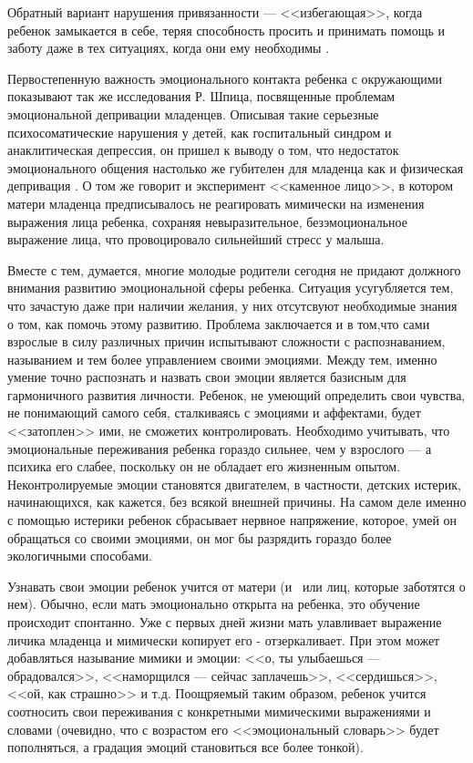 \documentclass{../../common/thesisbyxetex}
\begin{document}
Обратный вариант нарушения привязанности --- <<избегающая>>, когда ребенок замыкается в  себе, 
теряя способность просить и принимать помощь и заботу даже в тех ситуациях, когда они ему 
необходимы \cite{boulby}.

Первостепенную важность эмоционального контакта ребенка с окружающими показывают так же 
исследования Р. Шпица, посвященные проблемам эмоциональной депривации младенцев. Описывая такие 
серьезные психосоматические нарушения у детей, как госпитальный синдром и анаклитическая депрессия, 
он пришел к выводу о том, что недостаток эмоционального общения настолько же губителен для младенца 
как и физическая депривация \cite{spitz}. О том же говорит и эксперимент <<каменное лицо>>, в 
котором матери младенца предписывалось не реагировать мимически на изменения выражения лица 
ребенка, сохраняя невыразительное, безэмоциональное выражение лица, что провоцировало сильнейший 
стресс у малыша.

Вместе с тем, думается, многие молодые родители сегодня не придают должного внимания развитию 
эмоциональной сферы ребенка. Ситуация усугубляется тем, что зачастую даже при наличии желания, у 
них отсутсвуют необходимые знания о том, как помочь этому развитию. Проблема заключается и в 
том,что сами взрослые  в силу различных причин испытывают сложности с распознаванием, называнием и 
тем более управлением своими эмоциями. Между тем, именно умение точно распознать и назвать свои 
эмоции является базисным для гармоничного развития личности. Ребенок, не умеющий определить свои 
чувства, не понимающий самого себя, сталкиваясь с эмоциями и аффектами, будет <<затоплен>> ими, не 
сможетих контролировать. Необходимо учитывать, что эмоциональные переживания ребенка гораздо 
сильнее, чем у взрослого --- а психика его слабее, поскольку он не обладает его жизненным опытом. 
Неконтролируемые эмоции становятся двигателем, в частности, детских истерик, начинающихся, 
как кажется, без всякой внешней причины. На самом деле именно с помощью истерики ребенок сбрасывает 
нервное напряжение, которое, умей он обращаться со своими эмоциями, он мог бы разрядить гораздо 
более экологичными способами.

Узнавать свои эмоции ребенок учится от матери (и \ или лиц, которые заботятся о нем). Обычно, если 
мать эмоционально открыта на ребенка, это обучение происходит спонтанно. Уже с первых дней жизни 
мать улавливает выражение личика младенца и мимически копирует его - отзеркаливает. При этом может 
добавляться называние мимики и  эмоции: <<о, ты улыбаешься ---обрадовался>>,  <<наморщился  --- 
сейчас заплачешь>>, <<сердишься>>, <<ой, как страшно>> и т.д. Поощряемый таким образом, ребенок 
учится соотносить свои переживания с конкретными мимическими выражениями и словами (очевидно, что с 
возрастом его <<эмоциональный словарь>> будет пополняться, а градация эмоций становиться все более 
тонкой).
\end{document}
